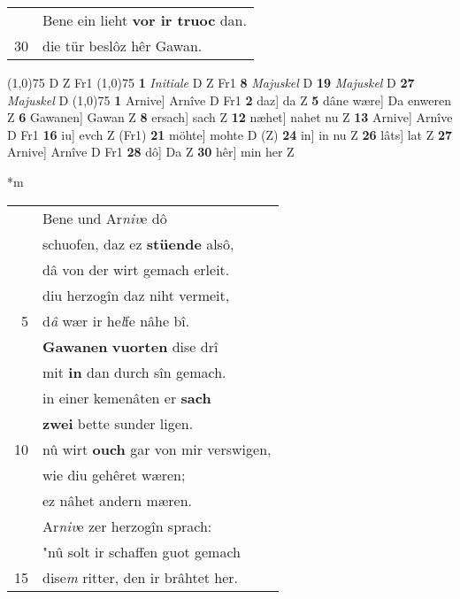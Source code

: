 \documentclass[8pt,a4paper,notitlepage]{article}
\begin{document}
\begin{table}[ht]
\begin{minipage}[t]{0.5\linewidth}
\begin{tabular}{rl}
 & Bene ein lieht \textbf{vor ir truoc} dan.\\ 
30 & die tür beslôz hêr Gawan.\\ 
\end{tabular}
\scriptsize
\line(1,0){75} \newline
D Z Fr1 \newline
\line(1,0){75} \newline
\textbf{1} \textit{Initiale} D Z Fr1  \textbf{8} \textit{Majuskel} D  \textbf{19} \textit{Majuskel} D  \textbf{27} \textit{Majuskel} D  \newline
\line(1,0){75} \newline
\textbf{1} Arnive] Arnîve D Fr1 \textbf{2} daz] da Z \textbf{5} dâne wære] Da enweren Z \textbf{6} Gawanen] Gawan Z \textbf{8} ersach] sach Z \textbf{12} næhet] nahet nu Z \textbf{13} Arnive] Arnîve D Fr1 \textbf{16} iu] evch Z (Fr1) \textbf{21} möhte] mohte D (Z) \textbf{24} in] in nu Z \textbf{26} lâts] lat Z \textbf{27} Arnive] Arnîve D Fr1 \textbf{28} dô] Da Z \textbf{30} hêr] min her Z \newline
\end{minipage}
\hspace{0.5cm}
\begin{minipage}[t]{0.5\linewidth}
\small
\begin{center}*m
\end{center}
\begin{tabular}{rl}
 & Bene und Ar\textit{niv}e dô\\ 
 & schuofen, daz ez \textbf{stüende} alsô,\\ 
 & dâ von der wirt gemach erleit.\\ 
 & diu herzogîn daz niht vermeit,\\ 
5 & d\textit{â} wær ir he\textit{l}fe nâhe bî.\\ 
 & \textbf{Gawanen} \textbf{vuorten} dise drî\\ 
 & mit \textbf{in} dan durch sîn gemach.\\ 
 & in einer kemenâten er \textbf{sach}\\ 
 & \textbf{zwei} bette sunder ligen.\\ 
10 & nû wirt \textbf{ouch} gar von mir verswigen,\\ 
 & wie diu gehêret wæren;\\ 
 & ez nâhet andern mæren.\\ 
 & Ar\textit{niv}e zer herzogîn sprach:\\ 
 & "nû solt ir schaffen guot gemach\\ 
15 & dise\textit{m} ritter, den ir brâhtet her.\\ 

\end{tabular}
\end{minipage}
\end{table}
\end{document}
